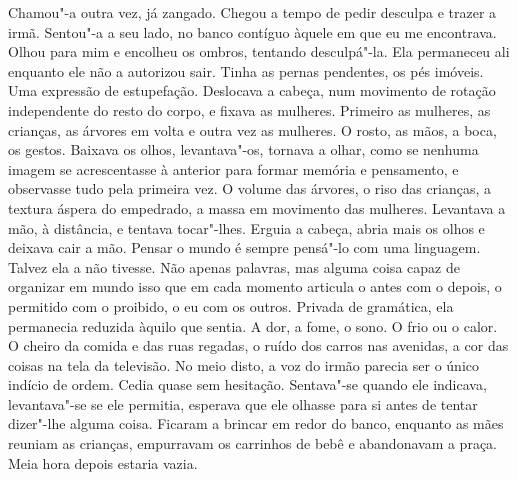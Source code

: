 Chamou"-a outra vez, já zangado. Chegou a tempo de pedir desculpa e
trazer a irmã. Sentou"-a a seu lado, no banco contíguo àquele em que eu
me encontrava. Olhou para mim e encolheu os ombros, tentando
desculpá"-la. Ela permaneceu ali enquanto ele não a autorizou sair.
Tinha as pernas pendentes, os pés imóveis. Uma expressão de
estupefação. Deslocava a cabeça, num movimento de rotação independente
do resto do corpo, e fixava as mulheres. Primeiro as mulheres, as
crianças, as árvores em volta e outra vez as mulheres. O rosto, as mãos,
a boca, os gestos. Baixava os olhos, levantava"-os, tornava a olhar,
como se nenhuma imagem se acrescentasse à anterior para formar memória e
pensamento, e observasse tudo pela primeira vez. O volume das árvores, o
riso das crianças, a textura áspera do empedrado, a massa em movimento
das mulheres. Levantava a mão, à distância, e tentava tocar"-lhes.
Erguia a cabeça, abria mais os olhos e deixava cair a mão. Pensar o
mundo é sempre pensá"-lo com uma linguagem. Talvez ela a não tivesse.
Não apenas palavras, mas alguma coisa capaz de organizar em mundo isso
que em cada momento articula o antes com o depois, o permitido com o
proibido, o eu com os outros. Privada de gramática, ela permanecia
reduzida àquilo que sentia. A dor, a fome, o sono. O frio ou o calor. O
cheiro da comida e das ruas regadas, o ruído dos carros nas avenidas, a
cor das coisas na tela da televisão. No meio disto, a voz do irmão
parecia ser o único indício de ordem. Cedia quase sem hesitação.
Sentava"-se quando ele indicava, levantava"-se se ele permitia,
esperava que ele olhasse para si antes de tentar dizer"-lhe alguma
coisa. Ficaram a brincar em redor do banco, enquanto as mães reuniam as
crianças, empurravam os carrinhos de bebê e abandonavam a praça. Meia
hora depois estaria vazia.

